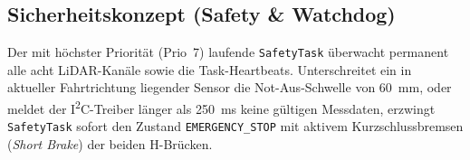 \subsection{Sicherheitskonzept (Safety \& Watchdog)}
Der mit höchster Priorität (Prio~7) laufende \texttt{SafetyTask} überwacht permanent alle acht LiDAR-Kanäle sowie die Task-Heartbeats. Unterschreitet ein in aktueller Fahrtrichtung liegender Sensor die Not-Aus-Schwelle von \qty{60}{\milli\meter}, oder meldet der I\textsuperscript{2}C-Treiber länger als \qty{250}{\milli\second} keine gültigen Messdaten, erzwingt \texttt{SafetyTask} sofort den Zustand \texttt{EMERGENCY\_STOP} mit aktivem Kurzschlussbremsen (\emph{Short Brake}) der beiden H-Brücken.
